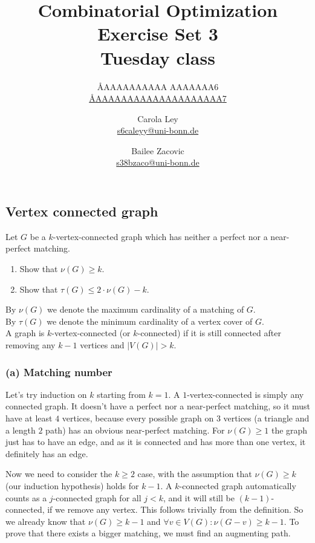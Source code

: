 \documentclass{article}
\title{Combinatorial Optimization \\ Exercise Set 3 \\ Tuesday class}
\author{
  \AA{AAAAAAAAAA AAAAAAA}{6} \\
  \href{mailto:\AA{AAAAAAAAAAAAAAAAAAAA}{7}}{\AA{AAAAAAAAAAAAAAAAAAAA}{7}}
  \and
  Carola Ley \\
  \href{mailto:s6caleyy@uni-bonn.de}{s6caleyy@uni-bonn.de}
  \and
  Bailee Zacovic \\
  \href{mailto:s38bzaco@uni-bonn.de}{s38bzaco@uni-bonn.de}
}
\begin{document}
  \maketitle

  \setcounter{section}{3}
  \subsection{Vertex connected graph}
  \begin{centerframebox}
    Let $G$ be a $k$-vertex-connected graph which has neither a perfect nor a near-perfect matching.

    \begin{enumerate}[label=(\alph*)]
      \item Show that $\nu(G) \geq k$.
      \item Show that $\tau(G) \leq 2 \cdot \nu(G) - k$.
    \end{enumerate}

    By $\nu(G)$ we denote the maximum cardinality of a matching of $G$. \\
    By $\tau(G)$ we denote the minimum cardinality of a vertex cover of $G$. \\
    A graph is $k$-vertex-connected (or $k$-connected) if it is still connected after removing any $k-1$ vertices and $|V(G)| > k$.
  \end{centerframebox}
  \subsubsection*{(a) Matching number}
  Let's try induction on $k$ starting from $k=1$.
  A $1$-vertex-connected is simply any connected graph.
  It doesn't have a perfect nor a near-perfect matching, so it must have at least $4$ vertices,
  because every possible graph on $3$ vertices (a triangle and a length $2$ path) has an obvious near-perfect matching.
  For $\nu(G) \geq 1$ the graph just has to have an edge, and as it is connected and has more than one vertex, it definitely has an edge.

  Now we need to consider the $k \geq 2$ case, with the assumption that $\nu(G) \geq k$ (our induction hypothesis) holds for $k-1$.
  A $k$-connected graph automatically counts as a $j$-connected graph for all $j < k$,
  and it will still be $(k-1)$-connected, if we remove any vertex.
  This follows trivially from the definition.
  So we already know that $\nu(G) \geq k-1$ and $\forall v \in V(G) : \nu(G - v) \geq k-1$.
  To prove that there exists a bigger matching, we must find an augmenting path.
\end{document}

